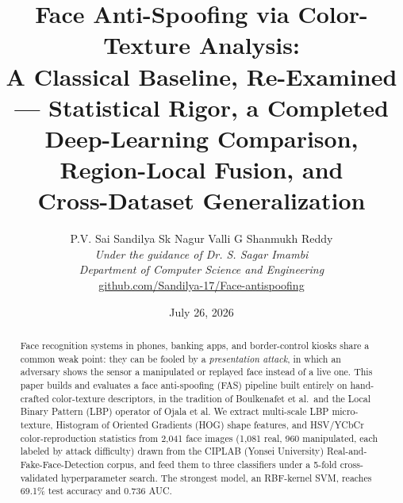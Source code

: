 \documentclass[11pt]{article}
\title{\textbf{Face Anti-Spoofing via Color-Texture Analysis:\\
A Classical Baseline, Re-Examined --- Statistical Rigor, a Completed\\
Deep-Learning Comparison, Region-Local Fusion, and\\
Cross-Dataset Generalization}}
\author{P.V. Sai Sandilya \quad Sk Nagur Valli \quad G Shanmukh Reddy\\[4pt]
\textit{Under the guidance of Dr. S. Sagar Imambi}\\[4pt]
\textit{Department of Computer Science and Engineering}\\
\url{github.com/Sandilya-17/Face-antispoofing}}
\date{July 26, 2026}
\begin{document}
\maketitle

\begin{abstract}
Face recognition systems in phones, banking apps, and border-control kiosks share a common weak point: they can be fooled by a \emph{presentation attack}, in which an adversary shows the sensor a manipulated or replayed face instead of a live one. This paper builds and evaluates a face anti-spoofing (FAS) pipeline built entirely on hand-crafted color-texture descriptors, in the tradition of Boulkenafet et al.\ and the Local Binary Pattern (LBP) operator of Ojala et al. We extract multi-scale LBP micro-texture, Histogram of Oriented Gradients (HOG) shape features, and HSV/YCbCr color-reproduction statistics from 2,041 face images (1,081 real, 960 manipulated, each labeled by attack difficulty) drawn from the CIPLAB (Yonsei University) Real-and-Fake-Face-Detection corpus, and feed them to three classifiers under a 5-fold cross-validated hyperparameter search. The strongest model, an RBF-kernel SVM, reaches 69.1\% test accuracy and 0.736 AUC.


\end{abstract}
\end{document}
